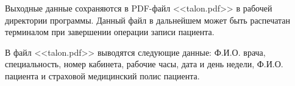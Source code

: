 Выходные данные сохраняются в PDF-файл <<talon.pdf>> в рабочей директории программы. Данный файл в дальнейшем может быть распечатан терминалом при завершении операции записи пациента. 

В файл <<talon.pdf>> выводятся следующие данные: Ф.И.О. врача, специальность, номер кабинета, рабочие часы, дата и день недели, Ф.И.О. пациента и страховой медицинский полис пациента.
